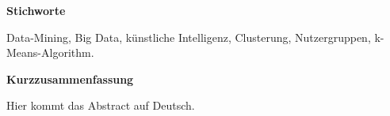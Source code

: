 {\Large \textbf{Stichworte}}\vspace{0.1cm}

Data-Mining, Big Data, künstliche Intelligenz, Clusterung, Nutzergruppen, k-Means-Algorithm.\vspace{0.5cm}

{\Large \textbf{Kurzzusammenfassung}}\vspace{0.1cm}

Hier kommt das Abstract auf Deutsch.
